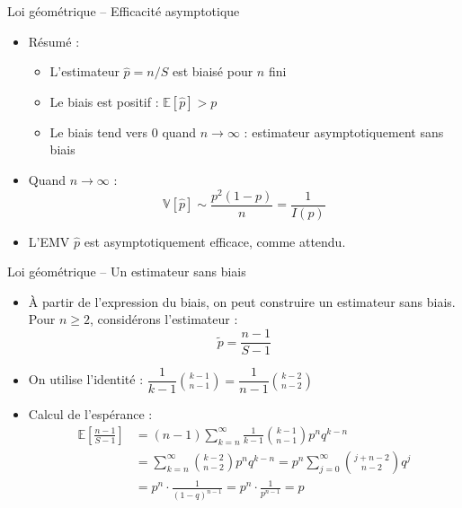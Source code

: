 \documentclass[11pt,aspectratio=169]{beamer}
\begin{document}
\begin{frame}{Loi géométrique -- Efficacité asymptotique}

\begin{itemize}

\item Résumé :
  \begin{itemize}
    \item L'estimateur $\hat{p} = n/S$ est biaisé pour $n$ fini\newline
    \item Le biais est positif : $\mathbb{E}[\hat{p}] > p$\newline
    \item Le biais tend vers 0 quand $n \to \infty$ : estimateur asymptotiquement sans biais\newline
  \end{itemize}

\item Quand $n \to \infty$ :
  \[
  \mathbb{V}[\hat{p}] \sim \frac{p^2(1-p)}{n} = \frac{1}{I(p)}
  \]

\item L'EMV $\hat{p}$ est asymptotiquement efficace, comme attendu.

\end{itemize}

\end{frame}

\begin{frame}{Loi géométrique -- Un estimateur sans biais}

\begin{itemize}

\item À partir de l'expression du biais, on peut construire un estimateur sans biais. Pour $n \geq 2$, considérons l'estimateur :
  \[
  \boxed{\tilde{p} = \frac{n-1}{S-1}}
  \]

\item On utilise l'identité : $\dfrac{1}{k-1} \binom{k-1}{n-1} = \dfrac{1}{n-1} \binom{k-2}{n-2}$\newline

\item Calcul de l'espérance :
  \begin{align*}
  \mathbb{E}\left[\frac{n-1}{S-1}\right] &= (n-1) \sum_{k=n}^{\infty} \frac{1}{k-1} \binom{k-1}{n-1} p^n q^{k-n} \\
  &= \sum_{k=n}^{\infty} \binom{k-2}{n-2} p^n q^{k-n} = p^n \sum_{j=0}^{\infty} \binom{j+n-2}{n-2} q^j \\
  &= p^n \cdot \frac{1}{(1-q)^{n-1}} = p^n \cdot \frac{1}{p^{n-1}} = \boxed{p}
  \end{align*}

\end{itemize}

\end{frame}
\end{document}
